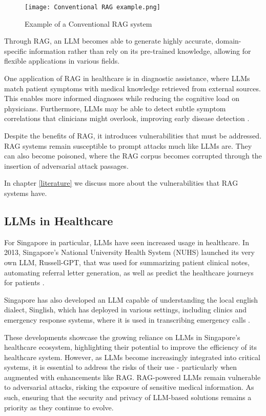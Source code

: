 \begin{figure}[htp]
	\texttt{[image: Conventional RAG example.png]}
	\caption{Example of a Conventional RAG system}
	\centering
	\label{fig:RAGexample}
\end{figure}

Through RAG, an LLM becomes able to generate highly accurate, domain-specific information rather than rely on its pre-trained knowledge, allowing for flexible applications in various fields.

One application of RAG in healthcare is in diagnostic assistance, where LLMs match patient symptoms with medical knowledge retrieved from external sources. This enables more informed diagnoses while reducing the cognitive load on physicians. Furthermore, LLMs may be able to detect subtle symptom correlations that clinicians might overlook, improving early disease detection \autocite{jin2024healthllmpersonalizedretrievalaugmenteddisease}.


Despite the benefits of RAG, it introduces vulnerabilities that must be addressed. RAG systems remain susceptible to prompt attacks much like LLMs are. They can also become poisoned, where the RAG corpus becomes corrupted through the insertion of adversarial attack passages.

In chapter \ref{literature} we discuss more about the vulnerabilities that RAG systems have.

\subsection{LLMs in Healthcare}

For Singapore in particular, LLMs have seen increased usage in healthcare. In 2013, Singapore's National University Health System (NUHS) launched its very own LLM, Russell-GPT, that was used for summarizing patient clinical notes, automating referral letter generation, as well as predict the healthcare journeys for patients \autocite{NUHS_2023}.

Singapore has also developed an LLM capable of understanding the local english dialect, Singlish, which has deployed in various settings, including clinics and emergency response systems, where it is used in transcribing emergency calls \autocite{Chia_2024}.

These developments showcase the growing reliance on LLMs in Singapore's healthcare ecosystem, highlighting their potential to improve the efficiency of its healthcare system. However, as LLMs become increasingly integrated into critical systems, it is essential to address the risks of their use - particularly when augmented with enhancements like RAG. RAG-powered LLMs remain vulnerable to adversarial attacks, risking the exposure of sensitive medical information. As such, ensuring that the security and privacy of LLM-based solutions remains a priority as they continue to evolve.
